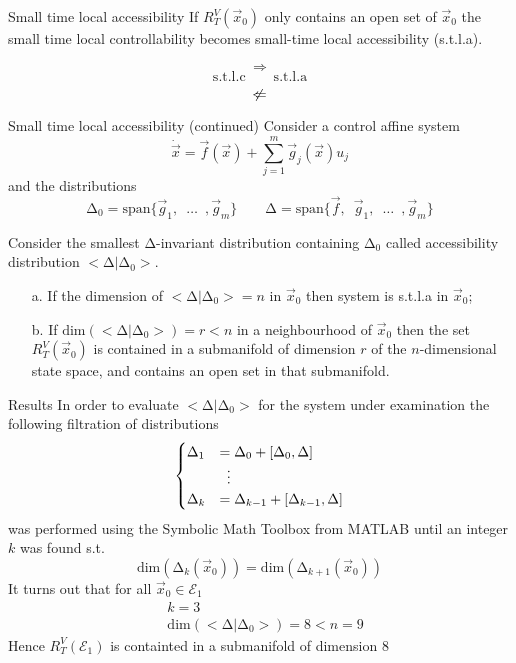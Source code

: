 \begin{frame}{Small time local accessibility}
  If $R_{T}^{V}(\vec{x}_0)$ only contains an open set of $\vec{x}_0$
  the small time local controllability becomes small-time local accessibility
  (s.t.l.a).
  \par
  \[
  \Rightarrow
  \]
  \[
  \text{s.t.l.c} \qquad \text{s.t.l.a}
  \]
  \[
  \centernot \Leftarrow
  \]
\end{frame}

\begin{frame}[shrink=10]{Small time local accessibility (continued)}
  Consider a control affine system
  \[
  \dot{\vec{x}} = \vec{f}(\vec{x}) + \sum\limits_{j=1}^{m}\vec{g}_j(\vec{x}) u_{j}
  \]
  and the distributions
  \[
  \mathrm{\Delta}_0 = \mathrm{span} \{\vec{g}_1, \enspace \hdots \enspace, \vec{g}_m\} \quad
  \quad
  \mathrm{\Delta} = \mathrm{span} \{\vec{f},\enspace\vec{g}_1, \enspace \hdots \enspace, \vec{g}_m\}
  \]
  \begin{theorem}
    Consider the smallest $\mathrm{\Delta}$-invariant distribution containing $\mathrm{\Delta}_0$
    called accessibility distribution $<\mathrm{\Delta}|\mathrm{\Delta}_0>$.
    \begin{itemize}
    \item[a.]If the dimension of $<\mathrm{\Delta}|\mathrm{\Delta}_0>= n$ in $\vec{x}_0$ then system
      is s.t.l.a in $\vec{x}_{0}$;
    \item[b.]If $\mathrm{dim}(<\mathrm{\Delta}|\mathrm{\Delta}_0>)= r < n$ in a neighbourhood of $\vec{x}_0$
      then the set $R_{T}^{V}(\vec{x}_0)$ is contained in a submanifold of dimension $r$ of the
      $n$-dimensional state space, and contains an open set in that submanifold.
    \end{itemize}
  \end{theorem}
\end{frame}

\begin{frame}[shrink=10]{Results}
  In order to evaluate $<\mathrm{\Delta}|\mathrm{\Delta}_0>$ for the system under examination
  the following filtration of distributions
  \[
  \begin{cases}
    \mathrm{\Delta}_1 &= \mathrm{\Delta}_0 + [\mathrm{\Delta}_0,\mathrm{\Delta}]\\
    &\vdotswithin{=} \\
    \mathrm{\Delta}_k &= \mathrm{\Delta}_{k-1} + [\mathrm{\Delta}_{k-1},\mathrm{\Delta}]
  \end{cases}
  \]
  was performed using the Symbolic Math Toolbox from MATLAB until an integer $k$ was found s.t.
  \[
  \text{dim}(\mathrm{\Delta}_{k}(\vec{x}_0)) = \text{dim}(\mathrm{\Delta}_{k+1}(\vec{x}_0))
  \]
  It turns out that for all $\vec{x}_{0} \in \mathcal{E}_{1}$ 
  \[
  \begin{split}
    &k = 3\\
    &\mathrm{dim}(<\mathrm{\Delta}|\mathrm{\Delta}_0>) = 8 < n = 9
  \end{split}
  \]
  Hence $R_{T}^{V}(\mathcal{E}_{1})$ is containted in a submanifold of dimension $8$

\end{frame}

